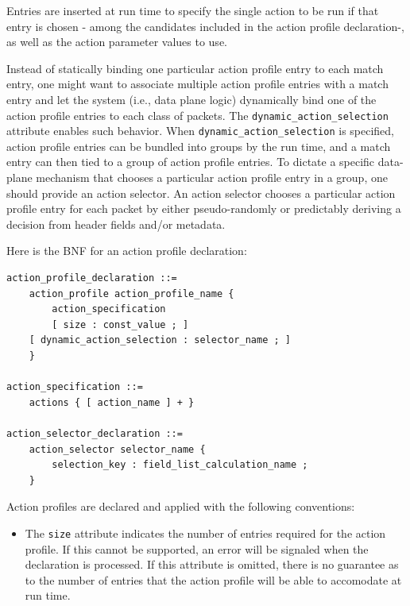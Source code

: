 \documentclass[12pt]{article}
\begin{document}
Entries are inserted at run time to specify the single action to be run if that
entry is chosen - among the candidates included in the action profile
declaration-, as well as the action parameter values to use.

Instead of statically binding one particular action profile entry to each match
entry, one might want to associate multiple action profile entries with a match
entry and let the system (i.e., data plane logic) dynamically bind one of the
action profile entries to each class of packets. The
\texttt{dynamic_action_selection} attribute enables such behavior. When
\texttt{dynamic_action_selection} is specified, action profile entries can be
bundled into groups by the run time, and a match entry can then tied to a group
of action profile entries. To dictate a specific data-plane mechanism that
chooses a particular action profile entry in a group, one should provide an
action selector. An action selector chooses a particular action profile entry
for each packet by either pseudo-randomly or predictably deriving a decision
from header fields and/or metadata.

Here is the BNF for an action profile declaration:

\begin{lstlisting}[style=BNFstyle]
action_profile_declaration ::=
    action_profile action_profile_name {
        action_specification
        [ size : const_value ; ]
	[ dynamic_action_selection : selector_name ; ]
    }

action_specification ::= 
    actions { [ action_name ] + }

action_selector_declaration ::=
    action_selector selector_name {
        selection_key : field_list_calculation_name ;
    }
\end{lstlisting}

Action profiles are declared and applied with the following conventions:

\begin{itemize}
\item
The \texttt{size} attribute indicates the number of entries required for the
action profile. If this cannot be supported, an error will be signaled when the
declaration is processed. If this attribute is omitted, there is no guarantee as
to the number of entries that the action profile will be able to accomodate at
run time.
\end{itemize}


\end{document}
